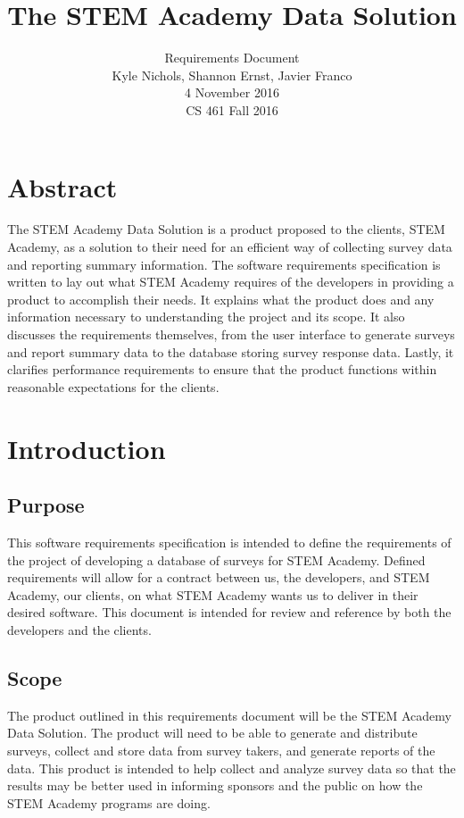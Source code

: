 \documentclass[letterpaper,10pt,serif, draftclsnofoot,onecolumn, compsoc, titlepage]{IEEEtran}
\title{The STEM Academy Data Solution}
\author{Requirements Document \\ Kyle Nichols, Shannon Ernst, Javier Franco\\ 4 November 2016\\ CS 461 Fall 2016}
\begin{document}
\maketitle

\section{Abstract}
The STEM Academy Data Solution is a product proposed to the clients, STEM Academy, as a solution to their need for an efficient way of collecting survey data and reporting summary information.
The software requirements specification is written to lay out what STEM Academy requires of the developers in providing a product to accomplish their needs.
It explains what the product does and any information necessary to understanding the project and its scope.
It also discusses the requirements themselves, from the user interface to generate surveys and report summary data to the database storing survey response data.
Lastly, it clarifies performance requirements to ensure that the product functions within reasonable expectations for the clients.

\newpage
\tableofcontents
\newpage

\section{Introduction}
\subsection{Purpose}
This software requirements specification is intended to define the requirements of the project of developing a database 
of surveys for STEM Academy. Defined requirements will allow for a contract between us, the developers, and STEM Academy, 
our clients, on what STEM Academy wants us to deliver in their desired software. This document is intended for review and
reference by both the developers and the clients.
\subsection{Scope}
The product outlined in this requirements document will be the STEM Academy Data Solution. The product will need to be able
to generate and distribute surveys, collect and store data from survey takers, and generate reports of the data.  This product
is intended to help collect and analyze survey data so that the results may be better used in informing sponsors and the public on
how the STEM Academy programs are doing. 
\end{document}
